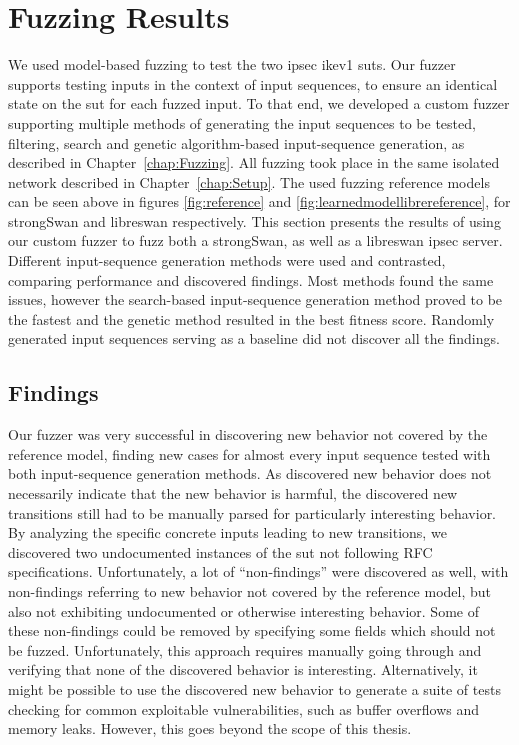 \section{Fuzzing Results} \label{sec:fuzzresults}
We used model-based fuzzing to test the two \ac{ipsec} \ac{ike}v1 \acp{sut}. Our fuzzer supports testing inputs in the context of input sequences, to ensure an identical state on the \ac{sut} for each fuzzed input. To that end, we developed a custom fuzzer supporting multiple methods of generating the input sequences to be tested, filtering, search and genetic algorithm-based input-sequence generation, as described in Chapter~\ref{chap:Fuzzing}. All fuzzing took place in the same isolated network described in Chapter~\ref{chap:Setup}. The used fuzzing reference models can be seen above in figures \ref{fig:reference} and \ref{fig:learnedmodellibrereference}, for strongSwan and libreswan respectively. This section presents the results of using our custom fuzzer to fuzz both a strongSwan, as well as a libreswan \ac{ipsec} server. Different input-sequence generation methods were used and contrasted, comparing performance and discovered findings. Most methods found the same issues, however the search-based input-sequence generation method proved to be the fastest and the genetic method resulted in the best fitness score. Randomly generated input sequences serving as a baseline did not discover all the findings. \\

\subsection{Findings} \label{subsec:findings}
Our fuzzer was very successful in discovering new behavior not covered by the reference model, finding new cases for almost every input sequence tested with both input-sequence generation methods. As discovered new behavior does not necessarily indicate that the new behavior is harmful, the discovered new transitions still had to be manually parsed for particularly interesting behavior. By analyzing the specific concrete inputs leading to new transitions, we discovered two undocumented instances of the \ac{sut} not following RFC specifications. Unfortunately, a lot of ``non-findings'' were discovered as well, with non-findings referring to new behavior not covered by the reference model, but also not exhibiting undocumented or otherwise interesting behavior. Some of these non-findings could be removed by specifying some fields which should not be fuzzed. Unfortunately, this approach requires manually going through and verifying that none of the discovered behavior is interesting. Alternatively, it might be possible to use the discovered new behavior to generate a suite of tests checking for common exploitable vulnerabilities, such as buffer overflows and memory leaks. However, this goes beyond the scope of this thesis.

